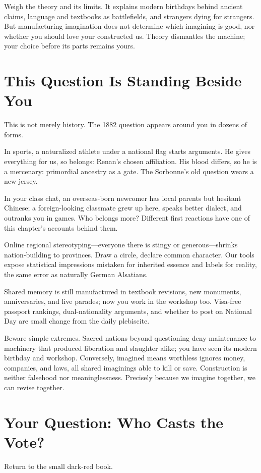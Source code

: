Weigh the theory and its limits. It explains modern birthdays behind ancient claims, language and textbooks as battlefields, and strangers dying for strangers. But manufacturing imagination does not determine which imagining is good, nor whether you should love your constructed us. Theory dismantles the machine; your choice before its parts remains yours.

\section{This Question Is Standing Beside You}
This is not merely history. The 1882 question appears around you in dozens of forms.

In sports, a naturalized athlete under a national flag starts arguments. He gives everything for us, so belongs: Renan's chosen affiliation. His blood differs, so he is a mercenary: primordial ancestry as a gate. The Sorbonne's old question wears a new jersey.

In your class chat, an overseas-born newcomer has local parents but hesitant Chinese; a foreign-looking classmate grew up here, speaks better dialect, and outranks you in games. Who belongs more? Different first reactions have one of this chapter's accounts behind them.

Online regional stereotyping---everyone there is stingy or generous---shrinks nation-building to provinces. Draw a circle, declare common character. Our tools expose statistical impressions mistaken for inherited essence and labels for reality, the same error as naturally German Alsatians.

Shared memory is still manufactured in textbook revisions, new monuments, anniversaries, and live parades; now you work in the workshop too. Visa-free passport rankings, dual-nationality arguments, and whether to post on National Day are small change from the daily plebiscite.

Beware simple extremes. Sacred nations beyond questioning deny maintenance to machinery that produced liberation and slaughter alike; you have seen its modern birthday and workshop. Conversely, imagined means worthless ignores money, companies, and laws, all shared imaginings able to kill or save. Construction is neither falsehood nor meaninglessness. Precisely because we imagine together, we can revise together.

\section{Your Question: Who Casts the Vote?}
Return to the small dark-red book.

